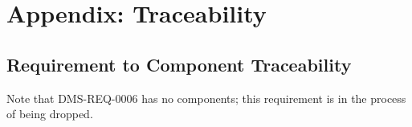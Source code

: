 \newpage
\section{Appendix: Traceability}\label{appendix-traceability}

\subsection{Requirement to Component
Traceability}\label{requirement-to-component-traceability}

Note that DMS-REQ-0006 has no components; this requirement is in the
process of being dropped.

\footnotesize
{}
